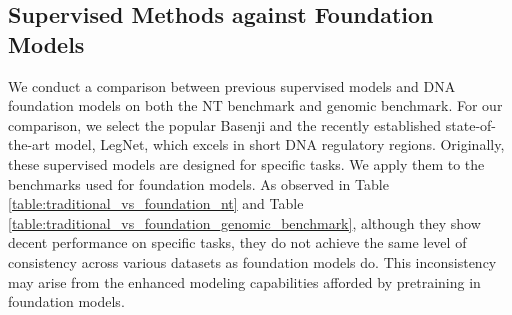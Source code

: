 \subsection{Supervised Methods against Foundation Models}\label{app:supvsfoundation}
We conduct a comparison between previous supervised models and DNA foundation models on both the NT benchmark and genomic benchmark. For our comparison, we select the popular Basenji and the recently established state-of-the-art model, LegNet, which excels in short DNA regulatory regions.  Originally, these supervised models are designed for specific tasks. We apply them to the benchmarks used for foundation models. As observed in Table \ref{table:traditional_vs_foundation_nt} and Table \ref{table:traditional_vs_foundation_genomic_benchmark}, although they show decent performance on specific tasks, they do not achieve the same level of consistency across various datasets as foundation models do. This inconsistency may arise from the enhanced modeling capabilities afforded by pretraining in foundation models.
